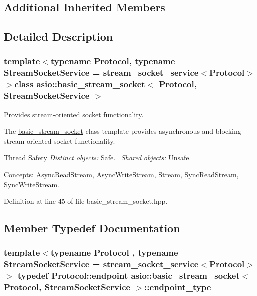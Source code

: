 \subsection*{Additional Inherited Members}


\subsection{Detailed Description}
\subsubsection*{template$<$typename Protocol, typename Stream\+Socket\+Service = stream\+\_\+socket\+\_\+service$<$\+Protocol$>$$>$class asio\+::basic\+\_\+stream\+\_\+socket$<$ Protocol, Stream\+Socket\+Service $>$}

Provides stream-\/oriented socket functionality. 

The \hyperlink{classasio_1_1basic__stream__socket}{basic\+\_\+stream\+\_\+socket} class template provides asynchronous and blocking stream-\/oriented socket functionality.

\begin{DoxyParagraph}{Thread Safety}
{\itshape Distinct} {\itshape objects\+:} Safe.~\newline
{\itshape Shared} {\itshape objects\+:} Unsafe.
\end{DoxyParagraph}
\begin{DoxyParagraph}{Concepts\+:}
Async\+Read\+Stream, Async\+Write\+Stream, Stream, Sync\+Read\+Stream, Sync\+Write\+Stream. 
\end{DoxyParagraph}


Definition at line 45 of file basic\+\_\+stream\+\_\+socket.\+hpp.



\subsection{Member Typedef Documentation}
\hypertarget{classasio_1_1basic__stream__socket_a910d3f9ffa82f284f3fccbecb2f2d3fb}{}
\subsubsection[{endpoint\+\_\+type}]{\setlength{\rightskip}{0pt plus 5cm}template$<$typename Protocol , typename Stream\+Socket\+Service  = stream\+\_\+socket\+\_\+service$<$\+Protocol$>$$>$ typedef Protocol\+::endpoint {\bf asio\+::basic\+\_\+stream\+\_\+socket}$<$ Protocol, Stream\+Socket\+Service $>$\+::{\bf endpoint\+\_\+type}}\label{classasio_1_1basic__stream__socket_a910d3f9ffa82f284f3fccbecb2f2d3fb}


